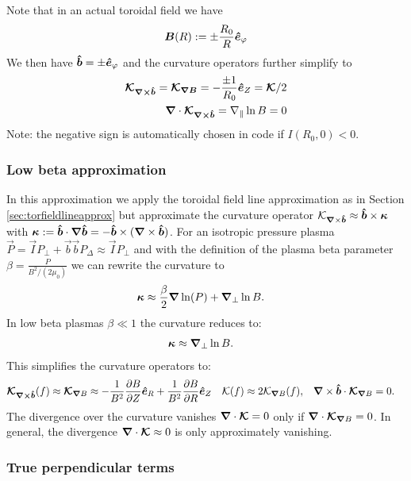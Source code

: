 Note that in an actual toroidal field we have
\begin{align}
  {\boldsymbol{B}}(R) := \pm \frac{R_0}{R} \bm{\hat{e}}_\varphi
  \label{}
\end{align}
We then have $\bm{\hat{b}} = \pm\bm{\hat{e}}_\varphi$ and the curvature operators further
simplify to
\begin{align}
  {\boldsymbol{ \mathcal K_{{\boldsymbol{\nabla}}\times\bm{\hat{b}}}}} = {\boldsymbol{ \mathcal K_{{\boldsymbol{\nabla}} B}}} = -\frac{\pm 1}{R_0} \bm{\hat{e}}_Z =
{\boldsymbol{ \mathcal K}}/2\\
  {\boldsymbol{\nabla}}\cdot{\boldsymbol{\mathcal K_{{{\boldsymbol{\nabla}}\times\bm{\hat{b}}}}}}=
    \nabla_\parallel \ln B = 0
    \label{}
\end{align}
Note: the negative sign is automatically chosen in code if $I(R_0, 0)<0$.

\subsubsection{Low beta approximation}\label{sec:lowbetaapprox}
In this approximation we apply the toroidal field line approximation
as in Section
\ref{sec:torfieldlineapprox}
but approximate the curvature operator $\mathcal K_{{\boldsymbol{\nabla}}\times\bm{\hat{b}}} \approx \bm{\hat{b}}\times{\boldsymbol{\kappa}}$
  with
  ${\boldsymbol{\kappa}} := \bm{\hat{b}} \cdot{\boldsymbol{\nabla}}\bm{\hat{b}} = -\bm{\hat{b}} \times( {\boldsymbol{\nabla}}\times \bm{\hat{b}})$.
For an isotropic pressure plasma \(\vec{P} = \vec{I} P_\perp + \vec{b} \vec{b} P_\Delta \approx \vec{I} P_\perp\) and with the definition of the plasma beta parameter
\(\beta = \frac{P}{B^2/(2 \mu_0) } \)
we can rewrite the curvature to
\begin{align}
    {\boldsymbol{\kappa}} &\approx \frac{\beta}{2} {\boldsymbol{\nabla}} \ln(P) +{\boldsymbol{\nabla}}_{\perp} \ln{B} .
\end{align}
In low beta plasmas \(\beta\ll1\) the curvature reduces to:
\begin{align}
    {\boldsymbol{\kappa}} & \approx {\boldsymbol{\nabla}}_{\perp} \ln{B} .
\end{align}
This simplifies the curvature operators to:
\begin{align}
{\boldsymbol{\mathcal{K}_{{{\boldsymbol{\nabla}}\times\bm{\hat{b}}}}}}(f) \approx
{\boldsymbol{ \mathcal{K} }}_{{\boldsymbol{\nabla}}  B}  &\approx  -\frac{1}{B^2}\frac{\partial B}{\partial Z}\bm{\hat{e}}_R +\frac{1}{B^2} \frac{\partial B}{\partial R}\bm{\hat{e}}_Z &
\mathcal{K} (f) &\approx 2\mathcal{K}_{{\boldsymbol{\nabla}}  B} (f) , &
    {\boldsymbol{\nabla}}\times\bm{\hat{b}} \cdot {\boldsymbol{\mathcal{K}}}_{{\boldsymbol{\nabla}}  B} &= 0.
\end{align}
The divergence over the curvature vanishes \( {\boldsymbol{\nabla}}\cdot {\boldsymbol{ \mathcal{K} }} = 0\) only if \( {\boldsymbol{\nabla}}\cdot {\boldsymbol{ \mathcal{K}}}_{{\boldsymbol{\nabla}}  B}   = 0\).
In general, the divergence \( {\boldsymbol{\nabla}}\cdot {\boldsymbol{ \mathcal{K} }} \approx 0\) is only approximately vanishing.
\subsubsection{True perpendicular terms}

